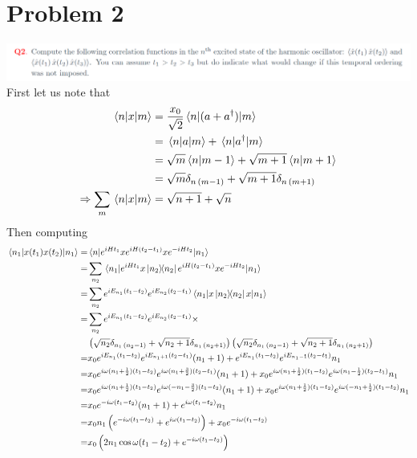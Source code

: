 \documentclass[a4paper,11pt]{article}
\begin{document}
\section*{Problem 2}
\hspace*{-1cm}\includegraphics[width=0.85\pagewidth]{2.png}
First let us note that
\begin{equation}
	\begin{aligned}
		\mel{n}{x}{m}&=\frac{x_0}{\sqrt{2}}\mel{n}{(a+a^\dagger)}{m}\\
		&=\mel{n}{a}{m}+\mel{n}{a^\dagger}{m}\\
		&=\sqrt{m}\braket{n}{m-1}+\sqrt{m+1}\braket{n}{m+1}\\
		&=\sqrt{m}\delta_{n\,(m-1)}+\sqrt{m+1}\delta_{n\,(m+1)}\\
		\Rightarrow\sum_m\mel{n}{x}{m}&=\sqrt{n+1}+\sqrt{n}
	\end{aligned}
\end{equation}
Then computing
\begin{equation}
	\begin{aligned}
		\mel{n_1}{x(t_1)x(t_2)}{n_1}=&\mel{n}{e^{iHt_1}xe^{iH(t_2-t_1)}xe^{-iHt_2}}{n_1}\\
		=&\sum_{n_2}\mel{n_1}{e^{iHt_1}x\dyad{n_2}{n_2}e^{iH(t_2-t_1)}xe^{-iHt_2}}{n_1}
		\\
		=&\sum_{n_2}e^{iE_{n_1}(t_1-t_2)}e^{iE_{n_2}(t_2-t_1)}\mel{n_1}{x\dyad{n_2}{n_2}x}{n_1}
		\\
		=&\sum_{n_2} e^{iE_{n_1}(t_1-t_2)}e^{iE_{n_2}(t_2-t_1)}\times \\
		&\left(\sqrt{n_2}\delta_{n_1\,(n_2-1)}+\sqrt{n_2+1}\delta_{n_1\,(n_2+1)}\right)\left(\sqrt{n_2}\delta_{n_1\,(n_2-1)}+\sqrt{n_2+1}\delta_{n_1\,(n_2+1)}\right)
		\\
		=&x_0e^{iE_{n_1}(t_1-t_2)}e^{iE_{n_1+1}(t_2-t_1)}(n_{1}+1)+e^{iE_{n_1}(t_1-t_2)}e^{iE_{n_1-1}(t_2-t_1)}n_1
		\\
		=&x_0e^{i\omega(n_1+\frac{1}{2})(t_1-t_2)}e^{i\omega(n_1+\frac{3}{2})(t_2-t_1)}(n_{1}+1)+x_0e^{i\omega(n_1+\frac{1}{2})(t_1-t_2)}e^{i\omega(n_1-\frac{1}{2})(t_2-t_1)}n_1
		\\
		=&x_0e^{i\omega(n_1+\frac{1}{2})(t_1-t_2)}e^{i\omega(-n_1-\frac{3}{2})(t_1-t_2)}(n_{1}+1)+x_0e^{i\omega(n_1+\frac{1}{2})(t_1-t_2)}e^{i\omega(-n_1+\frac{1}{2})(t_1-t_2)}n_1
		\\
		=&x_0e^{-i\omega(t_1-t_2)}(n_{1}+1)+e^{i\omega(t_1-t_2)}n_1
	\\
	=&x_0n_{1}\left(e^{-i\omega(t_1-t_2)}+e^{i\omega(t_1-t_2)}\right)+x_0e^{-i\omega(t_1-t_2)}
		\\
	=&x_0\left(2n_1\cos{\omega (t_1-t_2)}+e^{-i\omega(t_1-t_2)}\right)
	\end{aligned}
\end{equation}
\end{document}
